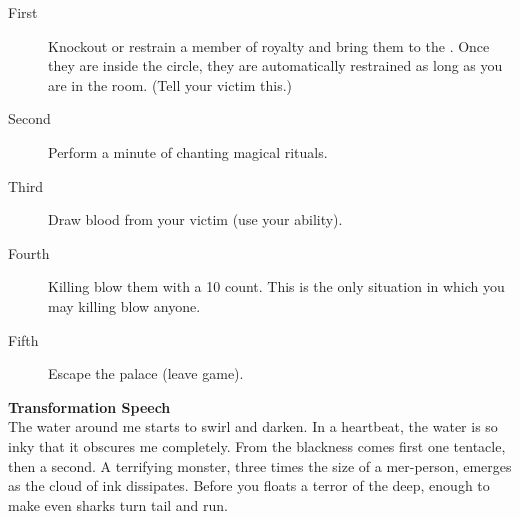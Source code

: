 \documentclass[green]{NeptuneBall}
\begin{document}
\begin{description}
\item[First] Knockout or restrain a member of royalty and bring them to the \sRunicCircle{}. Once they are inside the circle, they are automatically restrained as long as you are in the room. (Tell your victim this.)
\item[Second] Perform a minute of chanting magical rituals.
\item[Third] Draw blood from your victim (use your ability).
\item[Fourth] Killing blow them with a 10 count. This is the only situation in which you may killing blow anyone.
\item[Fifth] Escape the palace (leave game).
\end{description}

{\bf Transformation Speech}\\
The water around me starts to swirl and darken. In a heartbeat, the water is so inky that it obscures me completely. From the blackness comes first one tentacle, then a second. A terrifying monster, three times the size of a mer-person, emerges as the cloud of ink dissipates. Before you floats a terror of the deep, enough to make even sharks turn tail and run.
\end{document}

